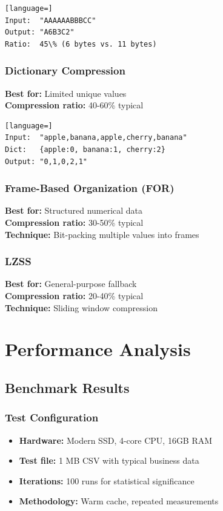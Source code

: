 \documentclass[12pt,a4paper]{report}
\begin{document}
\begin{lstlisting}[language=]
Input:  "AAAAAABBBCC"
Output: "A6B3C2"
Ratio:  45\% (6 bytes vs. 11 bytes)
\end{lstlisting}

\subsection{Dictionary Compression}

\textbf{Best for:} Limited unique values \\
\textbf{Compression ratio:} 40-60\% typical

\begin{lstlisting}[language=]
Input:  "apple,banana,apple,cherry,banana"
Dict:   {apple:0, banana:1, cherry:2}
Output: "0,1,0,2,1"
\end{lstlisting}

\subsection{Frame-Based Organization (FOR)}

\textbf{Best for:} Structured numerical data \\
\textbf{Compression ratio:} 30-50\% typical \\
\textbf{Technique:} Bit-packing multiple values into frames

\subsection{LZSS}

\textbf{Best for:} General-purpose fallback \\
\textbf{Compression ratio:} 20-40\% typical \\
\textbf{Technique:} Sliding window compression

\chapter{Performance Analysis}

\section{Benchmark Results}

\subsection{Test Configuration}
\begin{itemize}
    \item \textbf{Hardware:} Modern SSD, 4-core CPU, 16GB RAM
    \item \textbf{Test file:} 1 MB CSV with typical business data
    \item \textbf{Iterations:} 100 runs for statistical significance
    \item \textbf{Methodology:} Warm cache, repeated measurements
\end{itemize}
\end{document}
